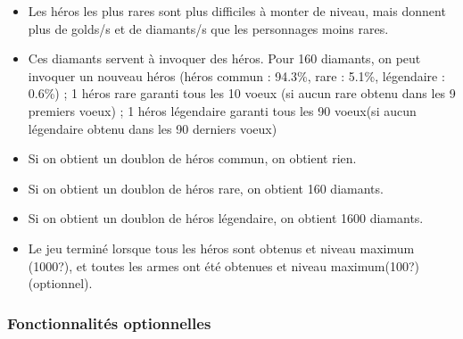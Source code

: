 \begin{itemize}
\begin{itemize}
                \item Les héros les plus rares sont plus difficiles à monter de niveau, mais donnent plus de golds/s et de diamants/s que les personnages moins rares.

                \item  Ces diamants servent à invoquer des héros. Pour 160 diamants, on peut invoquer un nouveau héros (héros commun : 94.3\%, rare : 5.1\%, légendaire : 0.6\%) ; 1 héros rare garanti tous les 10 voeux (si aucun rare obtenu dans les 9 premiers voeux) ; 1 héros légendaire garanti tous les 90 voeux(si aucun légendaire obtenu dans les 90 derniers voeux)

                \item Si on obtient un doublon de héros commun, on obtient rien.

                \item Si on obtient un doublon de héros rare, on obtient 160 diamants.

                \item Si on obtient un doublon de héros légendaire, on obtient 1600 diamants.

                \item Le jeu terminé lorsque tous les héros sont obtenus et niveau maximum (1000?), et toutes les armes ont été obtenues et niveau maximum(100?) (optionnel).
            \end{itemize}



        \end{itemize}



    \subsubsection{Fonctionnalités optionnelles}


